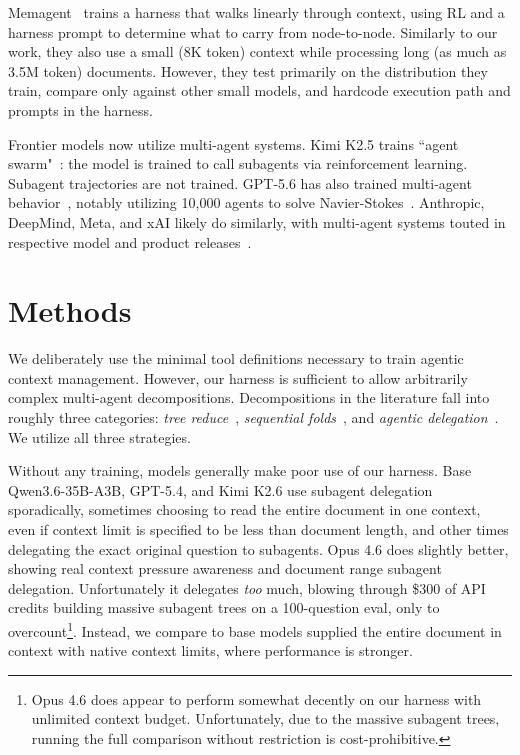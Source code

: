 \documentclass{article} %
\begin{document}
Memagent~\citep{yu2025memagent} trains a harness that walks linearly through context, using RL and a harness prompt to determine what to carry from node-to-node. Similarly to our work, they also use a small (8K token) context while processing long (as much as 3.5M token) documents. However, they test primarily on the distribution they train, compare only against other small models, and hardcode execution path and prompts in the harness.

Frontier models now utilize multi-agent systems. Kimi K2.5 trains ``agent swarm"~\citep{kimiteam2026kimik25}: the model is trained to call subagents via reinforcement learning. Subagent trajectories are not trained. GPT-5.6 has also trained multi-agent behavior~\citep{openai2026gpt56}, notably utilizing 10,000 agents to solve Navier-Stokes~\citep{openai2026navierstokes}. Anthropic, DeepMind, Meta, and xAI likely do similarly, with multi-agent systems touted in respective model and product releases~\citep{anthropic2025multiagent,anthropic2026agentteams,openai2026codexsubagents,xai2026grokmultiagent,xai2025grok4,meta2026musespark,google2025deepthink,gottweis2026coscientist}.

\section{Methods}
\label{methods}

We deliberately use the minimal tool definitions necessary to train agentic context management. However, our harness is sufficient to allow arbitrarily complex multi-agent decompositions. Decompositions in the literature fall into roughly three categories: \emph{tree reduce}~\citep{wu2021recursive,sarthi2024raptor,zhang2022summn}, \emph{sequential folds}~\citep{yu2025memagent,zhang2024coa}, and \emph{agentic delegation}~\citep{zhang2025rlm,kimiteam2026kimik25,anthropic2025multiagent}. We utilize all three strategies.

Without any training, models generally make poor use of our harness. Base Qwen3.6-35B-A3B, GPT-5.4, and Kimi K2.6 use subagent delegation sporadically, sometimes choosing to read the entire document in one context, even if context limit is specified to be less than document length, and other times delegating the exact original question to subagents. Opus 4.6 does slightly better, showing real context pressure awareness and document range subagent delegation. Unfortunately it delegates \emph{too} much, blowing through \$300 of API credits building massive subagent trees on a 100-question eval, only to overcount\footnote{Opus 4.6 does appear to perform somewhat decently on our harness with unlimited context budget. Unfortunately, due to the massive subagent trees, running the full comparison without restriction is cost-prohibitive.}. Instead, we compare to base models supplied the entire document in context with native context limits, where performance is stronger.
\end{document}
